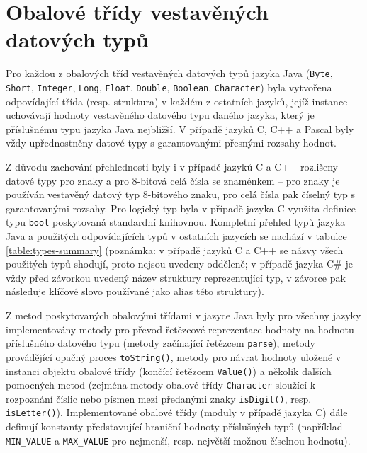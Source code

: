 \documentclass[onepage, a4paper, 12pt]{bakalarka}
\begin{document}
\section{Obalové třídy vestavěných datových typů}
Pro každou z obalových tříd vestavěných datových typů jazyka Java (\texttt{Byte}, \texttt{Short}, \texttt{Integer}, \texttt{Long}, \texttt{Float}, \texttt{Double}, \texttt{Boolean}, \texttt{Character}) byla vytvořena odpovídající třída (resp. struktura) v každém z ostatních jazyků, jejíž instance uchovávají hodnoty vestavěného datového typu daného jazyka, který je příslušnému typu jazyka Java nejbližší. V případě jazyků C, C++ a Pascal byly vždy upřednostněny datové typy s garantovanými přesnými rozsahy hodnot.\par
Z důvodu zachování přehlednosti byly i v případě jazyků C a C++ rozlišeny datové typy pro znaky a pro 8-bitová celá čísla se znaménkem -- pro znaky je používán vestavěný datový typ 8-bitového znaku, pro celá čísla pak číselný typ s garantovanými rozsahy. Pro logický typ byla v případě jazyka C využita definice typu \texttt{bool} poskytovaná standardní knihovnou. Kompletní přehled typů jazyka Java a použitých odpovídajících typů v ostatních jazycích se nachází v tabulce \ref{table:types-summary}
(poznámka: v případě jazyků C a C++ se názvy všech použitých typů shodují, proto nejsou uvedeny odděleně; v případě jazyka C\# je vždy před závorkou uvedený název struktury reprezentující typ, v závorce pak následuje klíčové slovo používané jako alias této struktury).\par
Z metod poskytovaných obalovými třídami v jazyce Java byly pro všechny jazyky implementovány metody pro převod řetězcové reprezentace hodnoty na hodnotu příslušného datového typu (metody začínající řetězcem \texttt{parse}), metody provádějící opačný proces \texttt{toString()}, metody pro návrat hodnoty uložené v instanci objektu obalové třídy (končící řetězcem \texttt{Value()}) a několik dalších pomocných metod (zejména metody obalové třídy \texttt{Character} sloužící k rozpoznání číslic nebo písmen mezi předanými znaky \texttt{isDigit()}, resp. \texttt{isLetter()}). Implementované obalové třídy (moduly v případě jazyka C) dále definují konstanty představující hraniční hodnoty příslušných typů (například \texttt{MIN\_VALUE} a \texttt{MAX\_VALUE} pro nejmenší, resp. největší možnou číselnou hodnotu).\par
\end{document}
